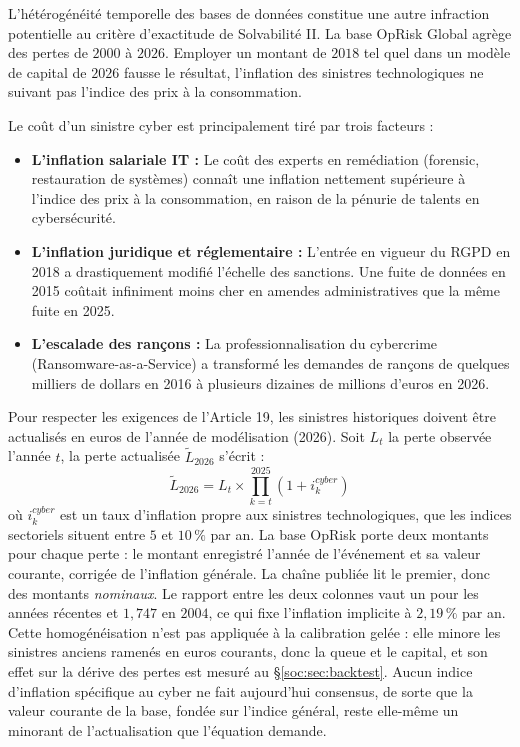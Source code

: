 L'hétérogénéité temporelle des bases de données constitue une autre infraction potentielle au critère d'exactitude de Solvabilité II. La base OpRisk Global agrège des pertes de $2000$ à $2026$. Employer un montant de $2018$ tel
quel dans un modèle de capital de $2026$ fausse le résultat, l'inflation des sinistres
technologiques ne suivant pas l'indice des prix à la consommation.

Le coût d'un sinistre cyber est principalement tiré par trois facteurs :
\begin{itemize}
    \item \textbf{L'inflation salariale IT :} Le coût des experts en remédiation (forensic, restauration de systèmes) connaît une inflation nettement supérieure à l'indice des prix à la consommation, en raison de la pénurie de talents en cybersécurité.
    \item \textbf{L'inflation juridique et réglementaire :} L'entrée en vigueur du RGPD en 2018 a drastiquement modifié l'échelle des sanctions. Une fuite de données en 2015 coûtait infiniment moins cher en amendes administratives que la même fuite en 2025.
    \item \textbf{L'escalade des rançons :} La professionnalisation du cybercrime (Ransomware-as-a-Service) a transformé les demandes de rançons de quelques milliers de dollars en 2016 à plusieurs dizaines de millions d'euros en 2026.
\end{itemize}

Pour respecter les exigences de l'Article 19, les sinistres historiques doivent être actualisés en euros de l'année de modélisation (2026). Soit $L_t$ la perte observée l'année $t$, la perte actualisée $\tilde{L}_{2026}$ s'écrit :
\begin{equation}
\tilde{L}_{2026} = L_t \times \prod_{k=t}^{2025} (1 + i_k^{cyber})
\end{equation}
où $i_k^{cyber}$ est un taux d'inflation propre aux sinistres technologiques, que les indices
sectoriels situent entre $5$ et $10\,\%$ par an. La base OpRisk porte deux montants pour chaque
perte : le montant enregistré l'année de l'événement et sa valeur courante, corrigée de
l'inflation générale. La chaîne publiée lit le premier, donc des montants \emph{nominaux}. Le
rapport entre les deux colonnes vaut un pour les années récentes et $1{,}747$ en $2004$, ce qui
fixe l'inflation implicite à $2{,}19\,\%$ par an. Cette homogénéisation n'est pas appliquée à la
calibration gelée : elle minore les sinistres anciens ramenés en euros courants, donc la queue et
le capital, et son effet sur la dérive des pertes est mesuré au \S\ref{soc:sec:backtest}. Aucun
indice d'inflation spécifique au cyber ne fait aujourd'hui consensus, de sorte que la valeur
courante de la base, fondée sur l'indice général, reste elle-même un minorant de l'actualisation
que l'équation demande.

